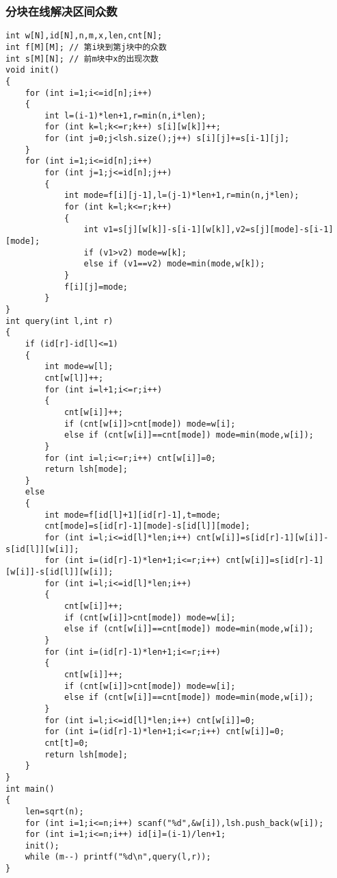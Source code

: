 \documentclass[a4paper]{ctexart}
\begin{document}
\subsubsection{分块在线解决区间众数}
\begin{lstlisting}
int w[N],id[N],n,m,x,len,cnt[N];
int f[M][M]; // 第i块到第j块中的众数
int s[M][N]; // 前m块中x的出现次数
void init()
{
    for (int i=1;i<=id[n];i++)
    {
        int l=(i-1)*len+1,r=min(n,i*len);
        for (int k=l;k<=r;k++) s[i][w[k]]++;
        for (int j=0;j<lsh.size();j++) s[i][j]+=s[i-1][j];
    }
    for (int i=1;i<=id[n];i++)
        for (int j=1;j<=id[n];j++)
        {
            int mode=f[i][j-1],l=(j-1)*len+1,r=min(n,j*len);
            for (int k=l;k<=r;k++)
            {
                int v1=s[j][w[k]]-s[i-1][w[k]],v2=s[j][mode]-s[i-1][mode];
                if (v1>v2) mode=w[k];
                else if (v1==v2) mode=min(mode,w[k]);
            }
            f[i][j]=mode;
        }
}
int query(int l,int r)
{
    if (id[r]-id[l]<=1)
    {
        int mode=w[l];
        cnt[w[l]]++;
        for (int i=l+1;i<=r;i++)
        {
            cnt[w[i]]++;
            if (cnt[w[i]]>cnt[mode]) mode=w[i];
            else if (cnt[w[i]]==cnt[mode]) mode=min(mode,w[i]);
        }
        for (int i=l;i<=r;i++) cnt[w[i]]=0;
        return lsh[mode];
    }
    else
    {
        int mode=f[id[l]+1][id[r]-1],t=mode;
        cnt[mode]=s[id[r]-1][mode]-s[id[l]][mode];
        for (int i=l;i<=id[l]*len;i++) cnt[w[i]]=s[id[r]-1][w[i]]-s[id[l]][w[i]];
        for (int i=(id[r]-1)*len+1;i<=r;i++) cnt[w[i]]=s[id[r]-1][w[i]]-s[id[l]][w[i]];
        for (int i=l;i<=id[l]*len;i++)
        {
            cnt[w[i]]++;
            if (cnt[w[i]]>cnt[mode]) mode=w[i];
            else if (cnt[w[i]]==cnt[mode]) mode=min(mode,w[i]);
        }
        for (int i=(id[r]-1)*len+1;i<=r;i++)
        {
            cnt[w[i]]++;
            if (cnt[w[i]]>cnt[mode]) mode=w[i];
            else if (cnt[w[i]]==cnt[mode]) mode=min(mode,w[i]);
        }
        for (int i=l;i<=id[l]*len;i++) cnt[w[i]]=0;
        for (int i=(id[r]-1)*len+1;i<=r;i++) cnt[w[i]]=0;
        cnt[t]=0;
        return lsh[mode];
    }
}
int main()
{
    len=sqrt(n);
    for (int i=1;i<=n;i++) scanf("%d",&w[i]),lsh.push_back(w[i]);
    for (int i=1;i<=n;i++) id[i]=(i-1)/len+1;
    init();
    while (m--) printf("%d\n",query(l,r));
}
\end{lstlisting}
\end{document}
